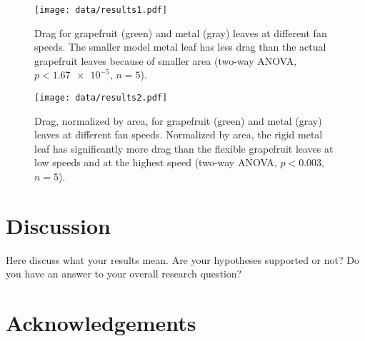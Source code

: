 \documentclass{article}
\begin{document}
\begin{figure}
\begin{center}
\texttt{[image: data/results1.pdf]}
\end{center}
\caption{Drag for grapefruit (green) and metal (gray) leaves at different fan speeds. The smaller model metal leaf has less drag than the actual grapefruit leaves because of smaller area (two-way ANOVA, $p<\num{1.67e-5}$, $n=5$).}
\label{fig:results1}
\end{figure}

\begin{figure}
\begin{center}
\texttt{[image: data/results2.pdf]}
\end{center}
\caption{Drag, normalized by area, for grapefruit (green) and metal (gray) leaves at different fan speeds. Normalized by area, the rigid metal leaf has significantly more drag than the flexible grapefruit leaves at low speeds and at the highest speed (two-way ANOVA, $p<0.003$, $n=5$).}
\label{fig:results2}
\end{figure}



\section{Discussion}
Here discuss what your results mean. Are your hypotheses supported or not? Do you have an answer to your overall research question?

\section{Acknowledgements}


\end{document}
